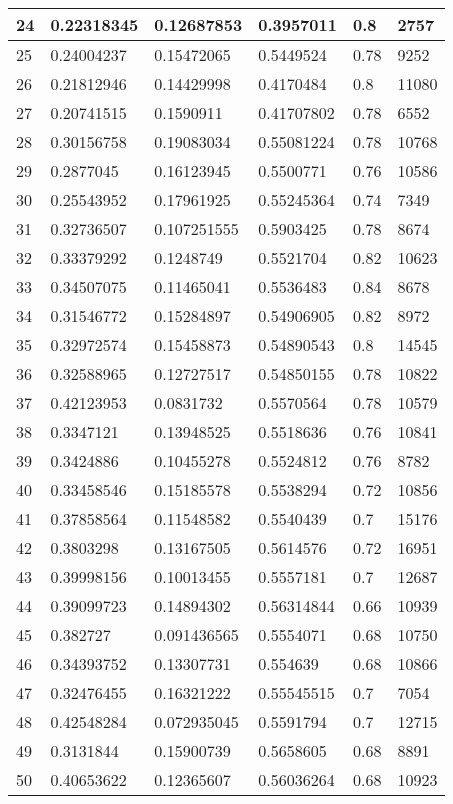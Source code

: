 \begin{longtable}{|l|l|l|l|l|l|}
24 & 0.22318345 & 0.12687853 & 0.3957011 & 0.8 & 2757 \\ \hline 
25 & 0.24004237 & 0.15472065 & 0.5449524 & 0.78 & 9252 \\ \hline 
26 & 0.21812946 & 0.14429998 & 0.4170484 & 0.8 & 11080 \\ \hline 
27 & 0.20741515 & 0.1590911 & 0.41707802 & 0.78 & 6552 \\ \hline 
28 & 0.30156758 & 0.19083034 & 0.55081224 & 0.78 & 10768 \\ \hline 
29 & 0.2877045 & 0.16123945 & 0.5500771 & 0.76 & 10586 \\ \hline 
30 & 0.25543952 & 0.17961925 & 0.55245364 & 0.74 & 7349 \\ \hline 
31 & 0.32736507 & 0.107251555 & 0.5903425 & 0.78 & 8674 \\ \hline 
32 & 0.33379292 & 0.1248749 & 0.5521704 & 0.82 & 10623 \\ \hline 
33 & 0.34507075 & 0.11465041 & 0.5536483 & 0.84 & 8678 \\ \hline 
34 & 0.31546772 & 0.15284897 & 0.54906905 & 0.82 & 8972 \\ \hline 
35 & 0.32972574 & 0.15458873 & 0.54890543 & 0.8 & 14545 \\ \hline 
36 & 0.32588965 & 0.12727517 & 0.54850155 & 0.78 & 10822 \\ \hline 
37 & 0.42123953 & 0.0831732 & 0.5570564 & 0.78 & 10579 \\ \hline 
38 & 0.3347121 & 0.13948525 & 0.5518636 & 0.76 & 10841 \\ \hline 
39 & 0.3424886 & 0.10455278 & 0.5524812 & 0.76 & 8782 \\ \hline 
40 & 0.33458546 & 0.15185578 & 0.5538294 & 0.72 & 10856 \\ \hline 
41 & 0.37858564 & 0.11548582 & 0.5540439 & 0.7 & 15176 \\ \hline 
42 & 0.3803298 & 0.13167505 & 0.5614576 & 0.72 & 16951 \\ \hline 
43 & 0.39998156 & 0.10013455 & 0.5557181 & 0.7 & 12687 \\ \hline 
44 & 0.39099723 & 0.14894302 & 0.56314844 & 0.66 & 10939 \\ \hline 
45 & 0.382727 & 0.091436565 & 0.5554071 & 0.68 & 10750 \\ \hline 
46 & 0.34393752 & 0.13307731 & 0.554639 & 0.68 & 10866 \\ \hline 
47 & 0.32476455 & 0.16321222 & 0.55545515 & 0.7 & 7054 \\ \hline 
48 & 0.42548284 & 0.072935045 & 0.5591794 & 0.7 & 12715 \\ \hline 
49 & 0.3131844 & 0.15900739 & 0.5658605 & 0.68 & 8891 \\ \hline 
50 & 0.40653622 & 0.12365607 & 0.56036264 & 0.68 & 10923 \\ \hline 
\end{longtable}